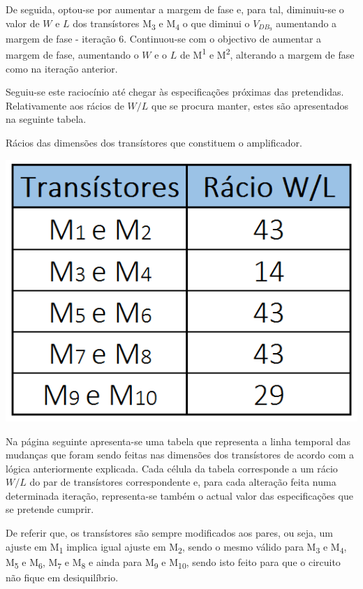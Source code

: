 \documentclass[11pt]{article}
\numberwithin{equation}{section}
\begin{document}
De seguida, optou-se por aumentar a margem de fase e, para tal, diminuiu-se o valor de $W$ e $L$ dos transístores M\textsubscript{3} e M\textsubscript{4} o que diminui o $V_{DB_9}$ aumentando a margem de fase - iteração 6. Continuou-se com o objectivo de aumentar a margem de fase, aumentando o $W$ e o $L$ de M\textsuperscript{1} e M\textsuperscript{2}, alterando a margem de fase como na iteração anterior.

Seguiu-se este raciocínio até chegar às especificações próximas das pretendidas. Relativamente aos rácios de $W/L$ que se procura manter, estes são apresentados na seguinte tabela.

\begin{table}[H]
	\centering
	\caption{Rácios das dimensões dos transístores que constituem o amplificador.}
	\vspace{-1.5mm}
	\includegraphics[keepaspectratio=true, scale=0.33]{teoricas/racios}
\end{table}

Na página seguinte apresenta-se uma tabela que representa a linha temporal das mudanças que foram sendo feitas nas dimensões dos transístores de acordo com a lógica anteriormente explicada. Cada célula da tabela corresponde a um rácio $W/L$ do par de transístores correspondente e, para cada alteração feita numa determinada iteração, representa-se também o actual valor das especificações que se pretende cumprir.

De referir que, os transístores são sempre modificados aos pares, ou seja, um ajuste em M\textsubscript{1} implica igual ajuste em M\textsubscript{2}, sendo o mesmo válido para M\textsubscript{3} e M\textsubscript{4}, M\textsubscript{5} e M\textsubscript{6}, M\textsubscript{7} e M\textsubscript{8} e ainda para M\textsubscript{9} e M\textsubscript{10}, sendo isto feito para que o circuito não fique em desiquilíbrio.
\end{document}
